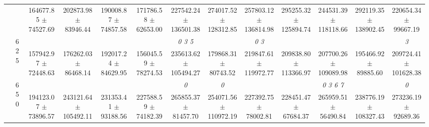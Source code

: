 \begin{table}[h]
{\begin{tabular}{
        ccccccccccccc}
 & & 164677.85 $\pm$ 74527.69& 202873.98 $\pm$ 83946.44& 190008.87 $\pm$ 74857.58& 171786.58 $\pm$ 62653.00& 227542.24 $\pm$ 136501.38& 274017.52 $\pm$ 128312.85& 257803.12 $\pm$ 136814.98& 295255.32 $\pm$ 125894.74& 244531.39 $\pm$ 118118.66& 292119.35 $\pm$ 138902.45& 220654.34 $\pm$ 99667.19 \\ 
 & \multirow{2}{*}{625}& \cellcolor[HTML]{EFEFEF} & \cellcolor[HTML]{EFEFEF} & \cellcolor[HTML]{EFEFEF} & \cellcolor[HTML]{EFEFEF} & \cellcolor[HTML]{EFEFEF} \textit{ 0 3 5 }& \cellcolor[HTML]{EFEFEF} & \cellcolor[HTML]{EFEFEF} \textit{ 0 3 }& \cellcolor[HTML]{EFEFEF} & \cellcolor[HTML]{EFEFEF} & \cellcolor[HTML]{EFEFEF} & \cellcolor[HTML]{EFEFEF} \textit{ 3 } \\ 
 & & \cellcolor[HTML]{EFEFEF} 157942.97 $\pm$ 72448.63& \cellcolor[HTML]{EFEFEF} 176262.03 $\pm$ 86468.14& \cellcolor[HTML]{EFEFEF} 192017.24 $\pm$ 84629.95& \cellcolor[HTML]{EFEFEF} 156045.59 $\pm$ 78274.53& \cellcolor[HTML]{EFEFEF} 235613.62 $\pm$ 105494.27& \cellcolor[HTML]{EFEFEF} 179868.31 $\pm$ 80743.52& \cellcolor[HTML]{EFEFEF} 219847.61 $\pm$ 119972.77& \cellcolor[HTML]{EFEFEF} 209838.80 $\pm$ 113366.97& \cellcolor[HTML]{EFEFEF} 207700.26 $\pm$ 109089.98& \cellcolor[HTML]{EFEFEF} 195466.92 $\pm$ 89885.60& \cellcolor[HTML]{EFEFEF} 209724.41 $\pm$ 101628.38 \\ 
 & \multirow{2}{*}{650}& & & & & \textit{ 0 }& \textit{ 0 }& & & \textit{ 0 3 6 7 }& & \textit{ 0 } \\ 
 & & 194123.07 $\pm$ 73896.57& 243121.64 $\pm$ 105492.11& 231353.41 $\pm$ 93188.56& 227588.59 $\pm$ 74182.39& 265855.37 $\pm$ 81457.70& 254071.56 $\pm$ 110972.19& 227392.75 $\pm$ 78002.81& 228451.47 $\pm$ 67684.37& 265959.51 $\pm$ 56490.84& 238776.19 $\pm$ 108327.43& 273236.19 $\pm$ 92689.36 \\ \midrule 

        \bottomrule
        \end{tabular}%
        }

        \end{table}
        
